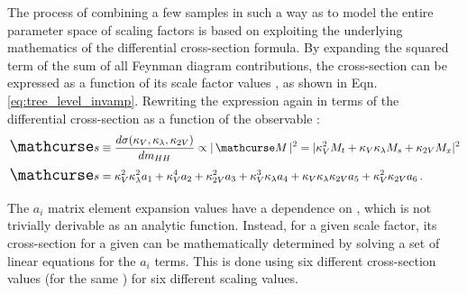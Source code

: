     The process of combining a few samples in such a way as to model the entire parameter space of scaling factors
        is based on exploiting the underlying mathematics of the differential cross-section formula.
    By expanding the squared term of the sum of all Feynman diagram contributions,
        the cross-section can be expressed as a function of its scale factor values \cite{ATLAS-CONF-2019-049},
        as shown in Eqn. \ref{eq:tree_level_invamp}.
    Rewriting the expression again in terms of the differential cross-section as a function of the observable \mhh:
    \begin{equation} \begin{split} \label{eq:tree_level_invamp_simple}
        \xsec &\equiv \dXsecM \propto |\invAmp|^2 = |  \kv^2 M_t + \kv \kl M_s + \kvv M_x |^2 \\
        \xsec &= \kv^2 \kl^2 a_1 + \kv^4 a_2 + \kvv^2 a_3 + \kv^3 \kl a_4 + \kv \kl \kvv a_5 + \kv^2 \kvv a_6
        \,.
    \end{split} \end{equation}

    \newcommand{\crossterm}[1]{
        \xsec_{#1} &= \fkv{#1}^2 \fkl{#1}^2 a_1
            + \fkv{#1}^4 a_2
            + \fkvv{#1}^2 a_3
            + \fkv{#1}^3 \fkl{#1} a_4
            + \fkv{#1} \fkl{#1} \fkvv{#1} a_5
            + \fkv{#1}^2 \fkvv{#1} a_6
    }
    \newcommand{\combterm}[1]{ g_{#1} \xsec_{#1} }

    The $a_i$ matrix element expansion values have a dependence on \mhh, which is not trivially derivable as an analytic function.
    Instead, for a given scale factor,
        its cross-section for a given \mhh can be mathematically determined by solving a set of linear equations for the $a_i$ terms.
    This is done using six different cross-section values (for the same \mhh) for six different scaling values.


